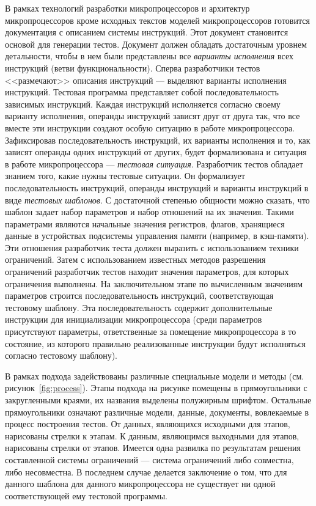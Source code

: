 В рамках технологий разработки микропроцессоров и архитектур микропроцессоров кроме исходных текстов моделей микропроцессоров готовится документация с описанием системы инструкций. Этот документ становится основой для генерации тестов. Документ должен обладать достаточным уровнем детальности, чтобы в нем были представлены все \emph{варианты исполнения} всех инструкций (ветви функциональности). Сперва разработчики тестов <<размечают>> описания инструкций --- выделяют варианты исполнения инструкций. Тестовая программа представляет собой последовательность зависимых инструкций. Каждая инструкций исполняется согласно своему варианту исполнения, операнды инструкций зависят друг от друга так, что все вместе эти инструкции создают особую ситуацию в работе микропроцессора. Зафиксировав последовательность инструкций, их варианты исполнения и то, как зависят операнды одних инструкций от других, будет формализована и ситуация в работе микропроцессора --- \emph{тестовая ситуация}. Разработчик тестов обладает знанием того, какие нужны тестовые ситуации. Он формализует последовательность инструкций, операнды инструкций и варианты инструкций в виде \emph{тестовых шаблонов}. С достаточной степенью общности можно сказать, что шаблон задает набор параметров и набор отношений на их значения. Такими параметрами являются начальные значения регистров, флагов, хранящиеся данные в устройствах подсистемы управления памяти (например, в кэш-памяти). Эти отношения разработчик теста должен выразить с использованием техники ограничений. Затем с использованием известных методов разрешения ограничений разработчик тестов находит значения параметров, для которых ограничения выполнены. На заключительном этапе по вычисленным значениям параметров строится последовательность инструкций, соответствующая тестовому шаблону. Эта последовательность содержит дополнительные инструкции для инициализации микропроцессора (среди параметров присутствуют параметры, ответственные за помещение микропроцессора в то состояние, из которого правильно реализованные инструкции будут исполняться согласно тестовому шаблону).

В рамках подхода задействованы различные специальные модели и методы (см. рисунок~\ref{fig:process}). Этапы подхода на рисунке помещены в прямоугольники с закругленными краями, их названия выделены полужирным шрифтом. Остальные прямоугольники означают различные модели, данные, документы, вовлекаемые в процесс построения тестов. От данных, являющихся исходными для этапов, нарисованы стрелки к этапам. К данным, являющимся выходными для этапов, нарисованы стрелки от этапов. Имеется одна развилка по результатам решения составленной системы ограничений --- система ограничений либо совместна, либо несовместна. В последнем случае делается заключение о том, что для данного шаблона для данного микропроцессора не существует ни одной соответствующей ему тестовой программы.

